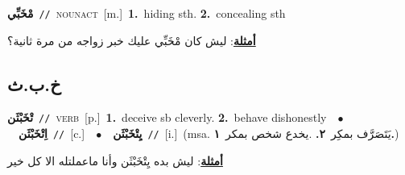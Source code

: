 \documentclass[10pt,a4paper,twoside]{article} %
\begin{document}
\begin{multicols}{2}
{\setlength\topsep{0pt}\textbf{\foreignlanguage{arabic}{مْخَبِّي}}\ {\color{gray}\texttt{//}\color{black}}\ \textsc{noun\textunderscore act}\ [m.]\ \textbf{1.}~hiding sth.  \textbf{2.}~concealing sth\  \begin{flushright}\color{gray}\foreignlanguage{arabic}{\textbf{\underline{\foreignlanguage{arabic}{أمثلة}}}: ليش كان مْخَبِّي عليك خبر زواجه من مرة ثانية؟}\end{flushright}\color{black}} \vspace{2mm}

\vspace{-3mm}
\subsection*{\color{blue}\foreignlanguage{arabic}{خ.ب.ث}\color{blue}{}} 

{\setlength\topsep{0pt}\textbf{\foreignlanguage{arabic}{تْخَبْثَن}}\ {\color{gray}\texttt{//}\color{black}}\ \textsc{verb}\ [p.]\ \textbf{1.}~deceive sb cleverly.  \textbf{2.}~behave dishonestly\ \ $\bullet$\ \ \setlength\topsep{0pt}\textbf{\foreignlanguage{arabic}{اِتْخَبْثَن}}\ {\color{gray}\texttt{//}\color{black}}\ [c.]\ \ $\bullet$\ \ \setlength\topsep{0pt}\textbf{\foreignlanguage{arabic}{يِتْخَبْثَن}}\ {\color{gray}\texttt{//}\color{black}}\ [i.]\ \color{gray}(msa. \foreignlanguage{arabic}{يَتَصَرَّف بمكِر}~\foreignlanguage{arabic}{\textbf{٢.}}  .\foreignlanguage{arabic}{يخدع شخص بمكر}~\foreignlanguage{arabic}{\textbf{١.}})\color{black}\  \begin{flushright}\color{gray}\foreignlanguage{arabic}{\textbf{\underline{\foreignlanguage{arabic}{أمثلة}}}: ليش بده يِتْخَبْثَن وأنا ماعملتله الا كل خير}\end{flushright}\color{black}} \vspace{2mm}


\end{multicols}
\end{document}
